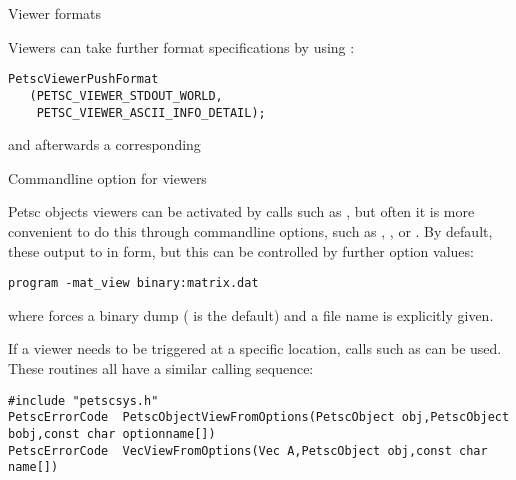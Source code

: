  {Viewer formats}

Viewers can take further format specifications by using
:
\begin{lstlisting}
PetscViewerPushFormat
   (PETSC_VIEWER_STDOUT_WORLD,
    PETSC_VIEWER_ASCII_INFO_DETAIL);
\end{lstlisting}
and afterwards a corresponding 

 {Commandline option for viewers}

Petsc objects viewers can be activated by calls such as ,
but often it is more convenient to do this through commandline options,
such as , ,
or .
By default, these output to  in  form,
but this can be controlled by further option values:
\begin{verbatim}
program -mat_view binary:matrix.dat
\end{verbatim}
where  forces a binary dump ( is the default)
and a file name is explicitly given.

If a viewer needs to be triggered at a specific location,
calls such as  can be used.
These routines all have a similar calling sequence:
\begin{lstlisting}
#include "petscsys.h"    
PetscErrorCode  PetscObjectViewFromOptions(PetscObject obj,PetscObject bobj,const char optionname[])
PetscErrorCode  VecViewFromOptions(Vec A,PetscObject obj,const char name[])
\end{lstlisting}

